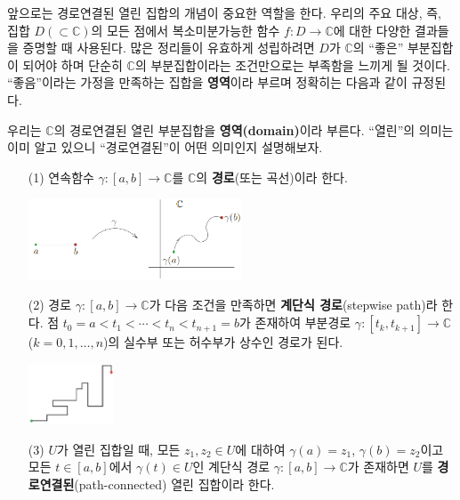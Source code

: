 앞으로는  경로연결된 열린 집합의 개념이 중요한 역할을 한다.
우리의 주요 대상, 즉, 집합 $D(\subset \mathbb C)$의 모든 점에서
복소미분가능한 함수 $f:D\to\mathbb C$에 대한 다양한 결과들을 증명할 때 사용된다.
많은 정리들이 유효하게 성립하려면 $D$가 $\mathbb C$의 ``좋은'' 부분집합이 되어야 하며
단순히 $\mathbb C$의 부분집합이라는 조건만으로는 부족함을 느끼게 될 것이다.
``좋음''이라는 가정을 만족하는 집합을 \textbf{영역}이라 부르며 정확히는 다음과 같이 규정된다.

우리는 $\mathbb C$의 경로연결된 열린 부분집합을 \textbf{영역(domain)}이라 부른다.
``열린''의 의미는 이미 알고 있으니 ``경로연결된''이 어떤 의미인지 설명해보자.

\begin{saltdefinition}{}{} \label{def-1-1}
\begin{itemize}
\item[(1)] 연속함수 $\gamma:[a,b] \to \mathbb C$를 $\mathbb C$의 
\textbf{경로}(또는 곡선)이라 한다.
\begin{center}
\includegraphics[width=0.5\textwidth]{./SaltChapter/figs/fig-1-0-2}
\end{center}
\item[(2)] 경로 $\gamma:[a,b] \to \mathbb C$가 다음 조건을 만족하면 
\textbf{계단식 경로}(stepwise path)라 한다.
점 $t_0 = a < t_1 < \cdots < t_n < t_{n+1} = b$가 존재하여
부분경로 $\gamma: [t_k, t_{k+1}] \to \mathbb C$ ($k=0,1,\ldots, n$)의
실수부 또는 허수부가 상수인 경로가 된다.
\begin{center}
\includegraphics[width=0.2\textwidth]{./SaltChapter/figs/fig-1-0-3}
\end{center}
\item[(3)] $U$가 열린 집합일 때,  모든 $z_1, z_2\in U$에 대하여
$\gamma(a)=z_1$, $\gamma(b)=z_2$이고 모든 $t\in[a,b]$에서 $\gamma(t)\in U$인
계단식 경로 $\gamma: [a,b] \to \mathbb C$가 존재하면
$U$를 \textbf{경로연결된}(path-connected) 열린 집합이라 한다.
\end{itemize}
\end{saltdefinition}

